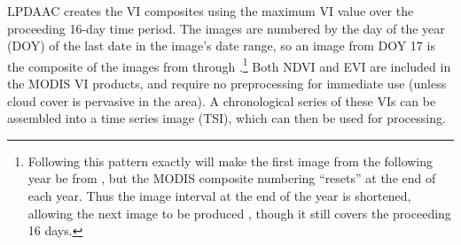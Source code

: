 LPDAAC creates the VI composites using the maximum VI value over the proceeding 16-day time period. The images are numbered by the day of the year (DOY) of the last date in the image's date range, so an image from DOY 17 is the composite of the images from \noyear{} through \noyear{}.\footnote{Following this pattern exactly will make the first image from the following year be from \noyear{}, but the MODIS composite numbering ``resets'' at the end of each year. Thus the image interval at the end of the year is shortened, allowing the next image to be produced \noyear{}, though it still covers the proceeding 16 days.} Both NDVI and EVI are included in the MODIS VI products, and require no preprocessing for immediate use (unless cloud cover is pervasive in the area). A chronological series of these VIs can be assembled into a time series image (TSI), which can then be used for processing.

